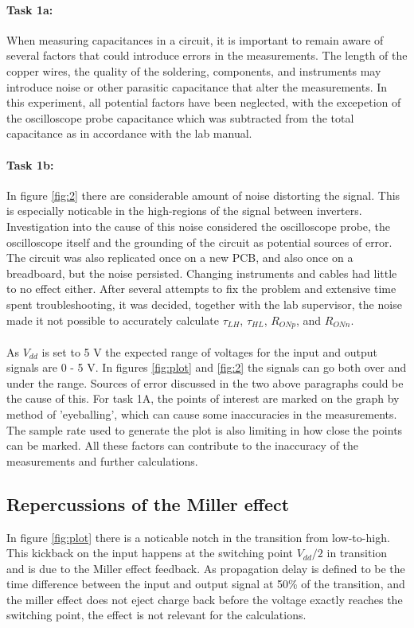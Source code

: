 \documentclass[onecolumn]{article}
\begin{document}
\paragraph{Task 1a:} 
When measuring capacitances in a circuit, it is important to remain aware of several factors that could introduce errors in the measurements. The length of the copper wires, the quality of the soldering, components, and instruments may introduce noise or other parasitic capacitance that alter the measurements. In this experiment, all potential factors have been neglected, with the excepetion of the oscilloscope probe capacitance which was subtracted from the total capacitance as in accordance with the lab manual.

\paragraph{Task 1b:} In figure \ref{fig:2} there are considerable amount of noise distorting the signal. This is especially noticable in the high-regions of the signal between inverters. Investigation into the cause of this noise considered the oscilloscope probe, the oscilloscope itself and the grounding of the circuit as potential sources of error. The circuit was also replicated once on a new PCB, and also once on a breadboard, but the noise persisted. Changing instruments and cables had little to no effect either. After several attempts to fix the problem and extensive time spent troubleshooting, it was decided, together with the lab supervisor, the noise made it not possible to accurately calculate $\tau_{LH}$, $\tau_{HL}$, $R_{ONp}$, and $R_{ONn}$. 

\paragraph{} As $V_{dd}$ is set to 5 V the expected range of voltages for the input and output signals are 0 - 5 V. In figures \ref{fig:plot} and \ref{fig:2} the signals can go both over and under the range. Sources of error discussed in the two above paragraphs could be the cause of this. For task 1A, the points of interest are marked on the graph by method of 'eyeballing', which can cause some inaccuracies in the measurements. The sample rate used to generate the plot is also limiting in how close the points can be marked. All these factors can contribute to the inaccuracy of the measurements and further calculations. 

\subsection{Repercussions of the Miller effect}
In figure \ref{fig:plot} there is a noticable notch in the transition from low-to-high. This kickback on the input happens at the switching point $V_{dd}/2$ in transition and is due to the Miller effect feedback. As propagation delay is defined to be the time difference between the input and output signal at 50\% of the transition, and the miller effect does not eject charge back before the voltage exactly reaches the switching point, the effect is not relevant for the calculations.
\end{document}
